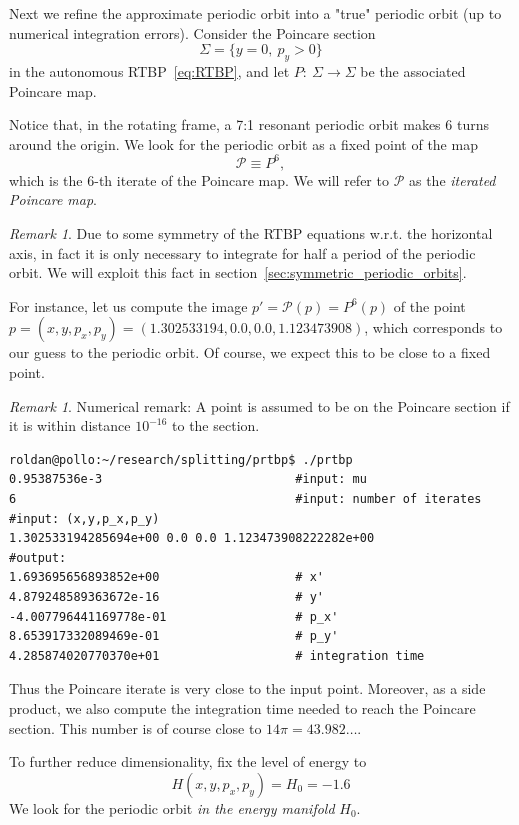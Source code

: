 \documentclass[a4paper]{amsart}
\theoremstyle{remark}
\newtheorem{rem}[thm]{Remark}
\newcommand{\sixmap}{\mathcal{P}}
\begin{document}
Next we refine the approximate periodic orbit into a "true" periodic orbit
(up to numerical integration errors).
Consider the Poincare section 
\[ \Sigma = \{ y=0,\ p_y>0 \} \] 
in the autonomous RTBP~\eqref{eq:RTBP}, and let $P\colon\
\Sigma\to\Sigma$ be the associated Poincare map.

Notice that, in the rotating frame, a 7:1 resonant periodic orbit
makes $6$ turns around the origin.
We look for the periodic orbit as a fixed point of the map
\[ \sixmap \equiv P^6, \] 
which is the $6$-th iterate of the Poincare map.
We will refer to $\sixmap$ as the \emph{iterated Poincare map}.

\begin{rem}
Due to some symmetry of the RTBP equations w.r.t. the horizontal axis,
in fact it is only necessary to integrate for half a period of the
periodic orbit. We will exploit this fact in
section~\ref{sec:symmetric_periodic_orbits}.
\end{rem}

For instance, let us compute the image $p'=\sixmap(p)=P^6(p)$ of the point
$p=(x,y,p_x,p_y)=(1.302533194,0.0,0.0,1.123473908)$, which corresponds
to our guess to the periodic orbit. 
Of course, we expect this to be close to a fixed point.

\begin{rem}
Numerical remark: 
A point is assumed to be on the Poincare section if it is within distance
$10^{-16}$ to the section.
\end{rem}

\begin{verbatim}
roldan@pollo:~/research/splitting/prtbp$ ./prtbp
0.95387536e-3                           #input: mu
6                                       #input: number of iterates
#input: (x,y,p_x,p_y)
1.302533194285694e+00 0.0 0.0 1.123473908222282e+00
#output:
1.693695656893852e+00                   # x'
4.879248589363672e-16                   # y'
-4.007796441169778e-01                  # p_x'
8.653917332089469e-01                   # p_y'
4.285874020770370e+01                   # integration time
\end{verbatim}
Thus the Poincare iterate is very close to the input point.
Moreover, as a side product, we also compute the integration time needed to
reach the Poincare section. This number is of course close to
$14\pi=43.982\dots$.

To further reduce dimensionality, fix the level of energy to
\begin{equation}\label{eq:energy}
H(x,y,p_x,p_y)=H_0=-1.6
\end{equation}
We look for the periodic orbit \emph{in the energy manifold} $H_0$.
\end{document}
